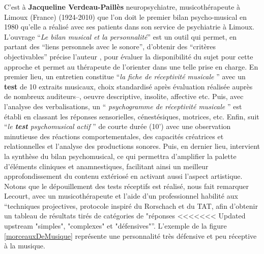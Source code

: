 C'est à \textbf{Jacqueline Verdeau-Paillès} neuropsychiatre,
  musicothérapeute à Limoux (France) (1924-2010) que l'on doit le premier bilan
                     psycho-musical en 1980 qu'elle a réalisé avec ses patients dans son service
                     de psychiatrie à Limoux.
L'ouvrage \enquote {\textit{Le bilan musical et la personnalité}}\autocite{verdeau-pailles:bilan}
                     est un outil qui permet, en partant des \enquote {liens personnels avec le sonore}, d'obtenir des \enquote {critères objectivables} précise l'auteur  \autocite[37]{vrait_musicotherapie_2018}, pour évaluer la disponibilité du sujet pour cette
                     approche et permet au thérapeute de l'orienter dans
                                 une telle prise en charge. En premier lieu, un entretien constitue \enquote {\textit{la fiche de réceptivité musicale} } avec un \textbf{test} de 10 extraits musicaux, choix standardisé après évaluation réalisée auprès de nombreux auditeurs--, oeuvre descriptive, insolite, affective etc.
Puis, avec l'analyse des verbalisations, un \enquote { \textit{psychogramme de réceptivité musicale} } est établi en classant les réponses sensorielles, cénestésiques, motrices, etc. Enfin, suit \enquote {\textit{le \textbf{test}  psychomusical actif} } \autocite{verdeau_expression} de courte durée (10') avec une observation minutieuse des réactions comportementales, des capacités créatrices et relationnelles et l'analyse des productions sonores. Puis, en  dernier lieu, intervient la synthèse du bilan psychomusical, ce qui permettra d'amplifier la palette d'éléments
                                cliniques et anamnestiques, facilitant ainsi un meilleur approfondissement du
                                 contenu extériosé en activant aussi l'aspect artistique.
Notons que le dépouillement des tests réceptifs est réalisé, nous fait remarquer Lecourt, avec un 
musicothérapeute et l'aide d'un professionnel habilité aux \enquote {techniques projectives, protocole 
inspiré du Rorschach et du TAT, afin d'obtenir un tableau de résultats tirés de catégories de "réponses 
<<<<<<< Updated upstream
"simples", "complexes" et "défensives"}\autocite[p.86] {lecourt_les_2017}. L'exemple de la figure \ref{morceauxDeMusique} représente  
une personnalité très défensive et peu réceptive à la musique. 
